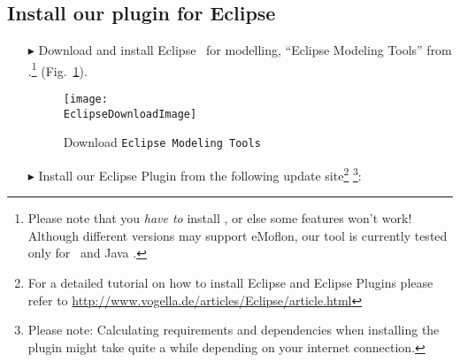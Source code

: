 \newpage
\genHeader
\hypertarget{installPlugin common}{} 
\subsection{Install our plugin for Eclipse}
 
\vspace{0.5cm}
 
\begin{itemize}
  
\item[$\blacktriangleright$] Download and install Eclipse \EclipseVersion~for modelling, ``Eclipse Modeling Tools'' from \EclipseDownloadLink.\footnote{Please
note that you \emph{have to} install \EclipseVersion, or else some features won't work! Although different versions may support eMoflon, our tool is currently
tested only for \EclipseVersion~and Java \JavaVersion.} (Fig.~\ref{fig:eclipseDownload}).

\begin{figure}[htbp]
	\centering
  	\texttt{[image: \\EclipseDownloadImage]}
	\caption{Download \texttt{Eclipse Modeling Tools}}
	\label{fig:eclipseDownload}
\end{figure}

\vspace{0.5cm}

\item[$\blacktriangleright$] Install our Eclipse Plugin from the following update site\footnote{For a detailed tutorial on how to install Eclipse and Eclipse
Plugins please refer to \url{http://www.vogella.de/articles/Eclipse/article.html}} \footnote{Please note: Calculating requirements and dependencies when
installing the plugin might take quite a while depending on your internet connection.}: \eMoflonUpdateSite


\end{itemize}
